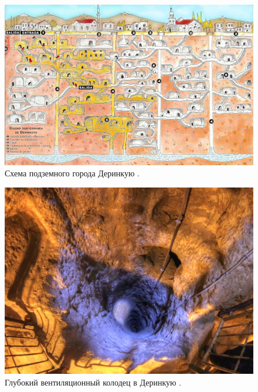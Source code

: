 \documentclass[10pt,twocolumn,letterpaper]{article}
\begin{document}
\begin{figure}[b]
\begin{center}
   \includegraphics[width=1\linewidth]{derinkuyu.jpeg}
\end{center}
   \caption{Схема подземного города Деринкую \cite{56}.}
\label{fig:5}
\label{fig:onecol}
\end{figure}

\begin{figure}[t]
\begin{center}
   \includegraphics[width=1\linewidth]{derinkuyu-air.jpg}
\end{center}
   \caption{Глубокий вентиляционный колодец в Деринкую \cite{53}.}
\label{fig:6}
\label{fig:onecol}
\end{figure}
\end{document}

